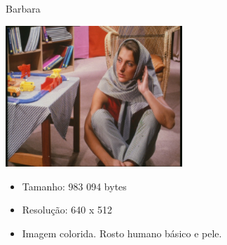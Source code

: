 \documentclass{beamer}
\begin{document}
\begin{frame}{Barbara}
   \begin{multicols}{2}
      \includegraphics[width=0.5\textwidth]{figure/barbara100.jpg}
      \begin{itemize}
         \item Tamanho: 983 094 bytes
         \item Resolução: 640 x 512
         \item Imagem colorida. Rosto humano básico e pele.
      \end{itemize}
   \end{multicols}
\end{frame}
\end{document}
